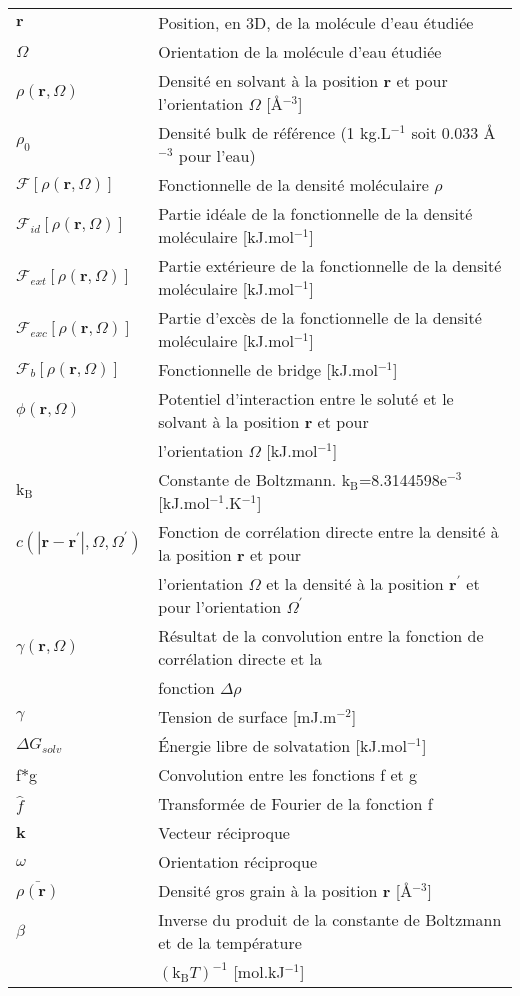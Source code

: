 \documentclass{bredele}
\begin{document}
\begin{tabular}{l l}
$\boldsymbol{r}$ & Position, en 3D, de la molécule d'eau étudiée \\
$\Omega$ & Orientation de la molécule d'eau étudiée \\
$\rho\left(\boldsymbol{r},\Omega \right)$ & Densité en solvant à la position $\boldsymbol{r}$ et pour l'orientation $\Omega$ [\AA$^{-3}$]  \\  
$\rho_0$ & Densité bulk de référence (1 kg.L$^{-1}$ soit 0.033 \AA$^{-3}$ pour l'eau) \\
$\mathcal{F}[\rho\left(\boldsymbol{r},\Omega \right)]$ & Fonctionnelle de la densité moléculaire $\rho$ \\
$\mathcal{F}_{id}[\rho\left(\boldsymbol{r},\Omega \right)]$ & Partie idéale de la fonctionnelle de la densité moléculaire [kJ.mol$^{-1}$]\\
$\mathcal{F}_{ext}[\rho\left(\boldsymbol{r},\Omega \right)]$ & Partie extérieure de la fonctionnelle de la densité moléculaire  [kJ.mol$^{-1}$]\\
$\mathcal{F}_{exc}[\rho\left(\boldsymbol{r},\Omega \right)]$ & Partie d'excès de la fonctionnelle de la densité moléculaire [kJ.mol$^{-1}$]\\
$\mathcal{F}_{b}[\rho\left(\boldsymbol{r},\Omega \right)]$ & Fonctionnelle de bridge [kJ.mol$^{-1}$]\\
$\phi\left(\boldsymbol{r},\Omega \right)$ & Potentiel d'interaction entre le soluté et le solvant à la position $\boldsymbol{r}$ et pour \\
 & l'orientation $\Omega$ [kJ.mol$^{-1}$]\\
$\mathrm{k_B}$ & Constante de Boltzmann. $\mathrm{k_B}$=8.3144598e$^{-3}$ [kJ.mol$^{-1}$.K$^{-1}$]\\
$c\left(\left|\boldsymbol{r}-\boldsymbol{r}^\prime\right|,\Omega,\Omega^\prime \right)$ & Fonction de corrélation directe entre la densité à la position $\boldsymbol{r}$ et pour \\
 & l'orientation $\Omega$ et la densité à la position $\boldsymbol{r}^\prime$ et pour l'orientation $\Omega^\prime$\\
$\gamma(\boldsymbol{r},\Omega)$ & Résultat de la convolution entre la  fonction de corrélation directe et la\\
& fonction $\Delta\rho$\\
$\gamma$ & Tension de surface [mJ.m$^{-2}$]\\
$\Delta G_{solv}$ & \'Energie libre de solvatation [kJ.mol$^{-1}$]\\
f$\ast$g & Convolution entre les fonctions f et g\\
$\hat{f}$ & Transformée de Fourier de la fonction f\\
$\boldsymbol{k}$ & Vecteur réciproque\\
$\omega$ & Orientation réciproque \\
$\bar{\rho(\boldsymbol{r})}$ & Densité gros grain à la position $\boldsymbol{r}$ [\AA$^{-3}$] \\
$\beta$ & Inverse du produit de la constante de Boltzmann et de la température \\
 & $(\mathrm{k_B}T)^{-1}$ [mol.kJ$^{-1}$]\\
\end{tabular}
\end{document}
